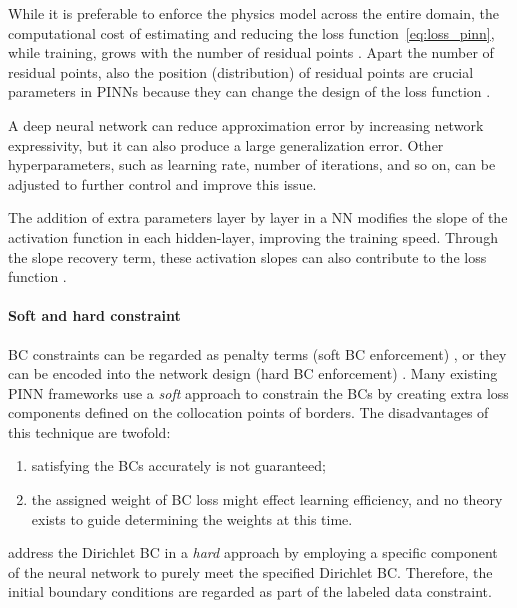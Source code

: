 \documentclass[pdflatex,sn-basic]{sn-jnl}%
\theoremstyle{thmstyleone}%
\theoremstyle{thmstyletwo}%
\theoremstyle{thmstylethree}%
\begin{document}
While it is preferable to enforce the physics model across the entire domain, the computational cost of estimating and reducing the loss function~\eqref{eq:loss_pinn}, while training,  grows with the number of residual points \citep{He2020_PhysicsInformedNeural_BarHBTT}.  
Apart the number of residual points, also the position (distribution) of residual points are crucial parameters in PINNs because they can change the design of the loss function \citep{Mao2020_PhysicsInformedNeural_JagMJK}.

A deep neural network can reduce approximation error by increasing network expressivity, but it can also produce a large generalization error.
%
Other hyperparameters, such as learning rate, number of iterations, and so on, can be adjusted to further control and improve this issue. 


The addition of extra parameters layer by layer  in a NN modifies the slope of the activation function in each hidden-layer, improving the training speed.
Through the slope recovery term, these activation slopes can also contribute to the loss function \citep{Jag2020_ConservativePhysicsInformed_KhaJKK}. 





\paragraph{Soft and hard constraint}

BC constraints can be regarded as penalty terms (soft BC enforcement) \citep{Zhu2019_PhysicsConstrainedDeep_ZabZZKP},
 or they can be encoded into the network design (hard BC enforcement) \citep{Sun2020_SurrogateModelingFluid_GaoSGPW}.
%
Many existing PINN frameworks use a \emph{soft} approach to constrain the BCs by creating extra loss components defined on the collocation points of borders.
The disadvantages of this technique are twofold:
\begin{enumerate}
    \item  satisfying the BCs accurately is not guaranteed;
    \item the assigned weight of BC loss might effect learning efficiency, and no theory exists to guide determining the weights at this time.
\end{enumerate}
%
\cite{Zhu2021_MachineLearningMetal_LiuZLY} address the Dirichlet BC in a \emph{hard} approach by employing a specific component of the neural network to purely meet the specified Dirichlet BC. 
Therefore, the initial boundary conditions are regarded as part of the labeled data constraint.%
\end{document}
